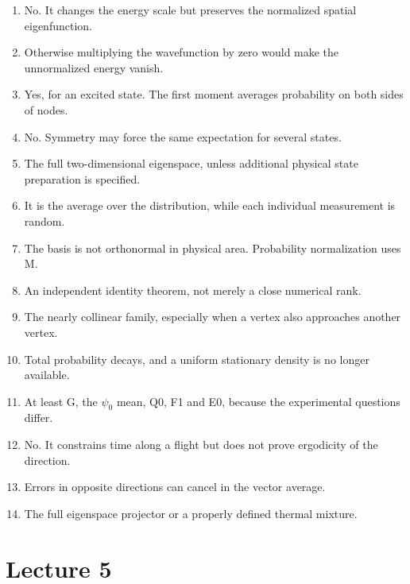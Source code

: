 \documentclass[11pt,oneside,openany]{book}
\begin{document}
\begin{enumerate}

\item No. It changes the energy scale but preserves the normalized spatial eigenfunction.

\item Otherwise multiplying the wavefunction by zero would make the unnormalized energy vanish.

\item Yes, for an excited state. The first moment averages probability on both sides of nodes.

\item No. Symmetry may force the same expectation for several states.

\item The full two-dimensional eigenspace, unless additional physical state preparation is specified.

\item It is the average over the distribution, while each individual measurement is random.

\item The basis is not orthonormal in physical area. Probability normalization uses M.

\item An independent identity theorem, not merely a close numerical rank.

\item The nearly collinear family, especially when a vertex also approaches another vertex.

\item Total probability decays, and a uniform stationary density is no longer available.

\item At least G, the $\psi_0$ mean, $\mathrm{Q0}$, F1 and E0, because the experimental questions differ.

\item No. It constrains time along a flight but does not prove ergodicity of the direction.

\item Errors in opposite directions can cancel in the vector average.

\item The full eigenspace projector or a properly defined thermal mixture.

\end{enumerate}

\section{Lecture 5}
\end{document}
